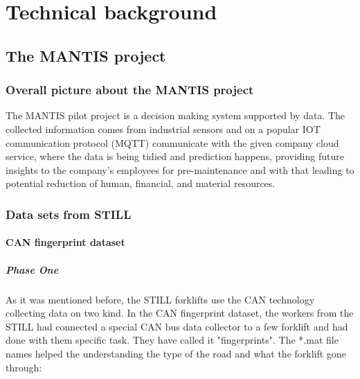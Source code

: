 \chapter{Technical background}
	\section{The MANTIS project}
		\subsection{Overall picture about the MANTIS project}
The MANTIS pilot project is a decision making system supported by data. The collected information comes from industrial sensors and on a popular IOT communication protocol (MQTT) communicate with the given company cloud service, where the data is being tidied and prediction happens, providing future insights to the company's employees for pre-maintenance and with that leading to potential reduction of human, financial, and material resources.

		\subsection{Data sets from STILL}
			\subsubsection{CAN fingerprint dataset}
				\paragraph{Phase One}
				\noindent
As it was mentioned before, the STILL forklifts use the CAN technology collecting data on two kind. In the CAN fingerprint dataset, the workers from the STILL had  connected a special CAN bus data collector to a few forklift and had done with them specific task. They have called it "fingerprints". The *.mat file names helped the understanding the type of the road and what the forklift gone through:

